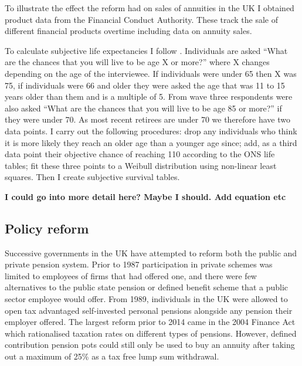 \documentclass[12pt]{article}
\begin{document}
To illustrate the effect the reform had on sales of annuities in the UK I obtained product data from the Financial Conduct Authority.
These track the sale of different financial products overtime including data on annuity sales.



To calculate subjective life expectancies I follow \cite{odea_sturrock_rest_2023}. Individuals are asked “What are the chances that you will
live to be age X or more?” where X changes depending on the age of the interviewee. If individuals were under 65 then X was 75, if individuals
were 66 and older they were asked the age that was 11 to 15 years older than them and is a multiple of 5. From wave three respondents were
also asked “What are the chances that you will live to be age 85 or more?” if they were under 70. As most recent retirees are under 70 we
therefore have two data points. I carry out the following procedures: drop any individuals who think it is more likely they reach an older
age than a younger age since; add, as a third data point their objective chance of reaching 110 according to the ONS life tables; fit these
three points to a Weibull distribution using non-linear least squares. Then I create subjective survival tables.

\textbf{I could go into more detail here? Maybe I should. Add equation etc}


\subsection{Policy reform}

Successive governments in the UK have attempted to reform both the public and private pension system. Prior
to 1987 participation in private schemes was limited to employees of firms that had offered one, and there
were few alternatives to the public state pension or defined benefit scheme that a public sector employee
would offer. From 1989, individuals in the UK were allowed to open tax advantaged self-invested personal pensions
alongside any pension their employer offered. The largest reform prior to 2014 came in the 2004 Finance Act which
rationalised taxation rates on different types of pensions. However, defined contribution pension pots could still
only be used to buy an annuity after taking out a maximum of 25\% as a tax free lump sum withdrawal.
\end{document}
